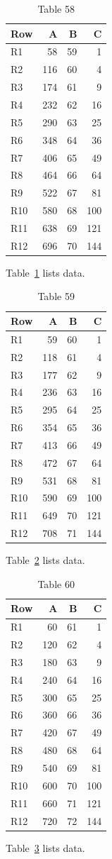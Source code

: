 \documentclass[10pt]{article}
\begin{document}
\begin{table}[ht]\centering\caption{Table 58}\label{tab:58}\begin{tabular}{lrrr}\toprule Row&A&B&C\\\midrule
R1&58&59&1\\
R2&116&60&4\\
R3&174&61&9\\
R4&232&62&16\\
R5&290&63&25\\
R6&348&64&36\\
R7&406&65&49\\
R8&464&66&64\\
R9&522&67&81\\
R10&580&68&100\\
R11&638&69&121\\
R12&696&70&144\\
\bottomrule\end{tabular}\end{table} Table~\ref{tab:58} lists data.
\begin{table}[ht]\centering\caption{Table 59}\label{tab:59}\begin{tabular}{lrrr}\toprule Row&A&B&C\\\midrule
R1&59&60&1\\
R2&118&61&4\\
R3&177&62&9\\
R4&236&63&16\\
R5&295&64&25\\
R6&354&65&36\\
R7&413&66&49\\
R8&472&67&64\\
R9&531&68&81\\
R10&590&69&100\\
R11&649&70&121\\
R12&708&71&144\\
\bottomrule\end{tabular}\end{table} Table~\ref{tab:59} lists data.
\begin{table}[ht]\centering\caption{Table 60}\label{tab:60}\begin{tabular}{lrrr}\toprule Row&A&B&C\\\midrule
R1&60&61&1\\
R2&120&62&4\\
R3&180&63&9\\
R4&240&64&16\\
R5&300&65&25\\
R6&360&66&36\\
R7&420&67&49\\
R8&480&68&64\\
R9&540&69&81\\
R10&600&70&100\\
R11&660&71&121\\
R12&720&72&144\\
\bottomrule\end{tabular}\end{table}\clearpage Table~\ref{tab:60} lists data.
\end{document}
